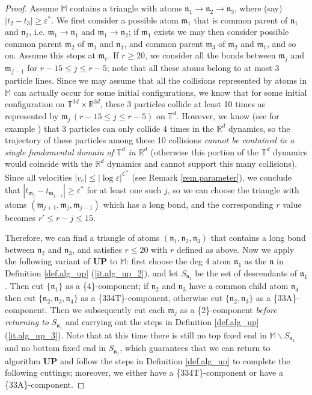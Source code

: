 \documentclass[10pt, reqno]{amsart}
\newcommand{\Mb}{\mathbb M}
\newcommand{\Rb}{\mathbb R}
\newcommand{\Tb}{\mathbb T}
\newcommand{\mf}{\mathfrak m}
\newcommand{\nf}{\mathfrak n}
\theoremstyle{definition}
\theoremstyle{remark}
\numberwithin{equation}{section}
\begin{document}
\begin{proof} Assume $\Mb$ contains a triangle with atoms $\nf_1\rightarrow\nf_2\rightarrow\nf_3$, where (say) $|t_2-t_3|\geq\varepsilon^*$. We first consider a possible atom $\mf_1$ that is common parent of $\nf_1$ and $\nf_2$, i.e. $\mf_1\rightarrow \nf_1$ and $\mf_1\rightarrow\nf_2$; if $\mf_1$ exists we may then consider possible common parent $\mf_2$ of $\mf_1$ and $\nf_1$, and common parent $\mf_3$ of $\mf_2$ and $\mf_1$, and so on. Assume this stops at $\mf_r$. If $r\geq 20$, we consider all the bonds between $\mf_j$ and $\mf_{j-1}$ for $r-15\leq j\leq r-5$; note that all these atoms belong to at most 3 particle lines. Since we may assume that all the collisions represented by atoms in $\Mb$ can actually occur for some initial configurations, we know that for some initial configuration on $\Tb^{3d}\times\Rb^{3d}$, these 3 particles collide at least 10 times as represented by $\mf_j\,(r-15\leq j\leq r-5)$ on $\Tb^d$. However, we know (see for example \cite{CM93}) that 3 particles can only collide 4 times in the $\Rb^d$ dynamics, so the trajectory of these particles among these 10 collisions \emph{cannot be contained in a single fundamental domain of $\Tb^d$ in $\Rb^d$} (otherwise this portion of the $\Tb^d$ dynamics would coincide with the $\Rb^d$ dynamics and cannot support this many collisions). Since all velocities $|v_e|\leq|\log\varepsilon|^{C^*}$ (see Remark \ref{rem.parameter}), we conclude that $|t_{\mf_j}-t_{\mf_{j-1}}|\geq \varepsilon^*$ for at least one such $j$, so we can choose the triangle with atoms $(\mf_{j+1},\mf_j,\mf_{j-1})$ which has a long bond, and the corresponding $r$ value becomes $r'\leq r-j\leq 15$.

Therefore, we can find a triangle of atoms $(\nf_1,\nf_2,\nf_3)$ that contains a long bond between $\nf_2$ and $\nf_3$, and satisfies $r\leq 20$ with $r$ defined as above. Now we apply the following variant of \textbf{UP} to $\Mb$: first choose the deg 4 atom $\nf_1$ as the $\nf$ in Definition \ref{def.alg_up} (\ref{it.alg_up_2}), and let $S_{\nf_1}$ be the set of descendants of $\nf_1$. Then cut $\{\nf_1\}$ as a \{4\}-component; if $\nf_2$ and $\nf_3$ have a common child atom $\nf_4$ then cut $\{\nf_2,\nf_3,\nf_4\}$ as a \{334T\}-component, otherwise cut $\{\nf_2,\nf_3\}$ as a \{33A\}-component. Then we subsequently cut each $\mf_j$ as a \{2\}-component \emph{before returning to} $S_{\nf_1}$ and carrying out the steps in Definition \ref{def.alg_up} (\ref{it.alg_up_3}). Note that at this time there is still no top fixed end in $\Mb\backslash S_{\nf_1}$ and no bottom fixed end in $S_{\nf_1}$, which guarantees that we can return to algorithm \textbf{UP} and follow the steps in Definition \ref{def.alg_up} to complete the following cuttings; moreover, we either have a \{334T\}-component or have a \{33A\}-component.


\end{proof}
\end{document}
